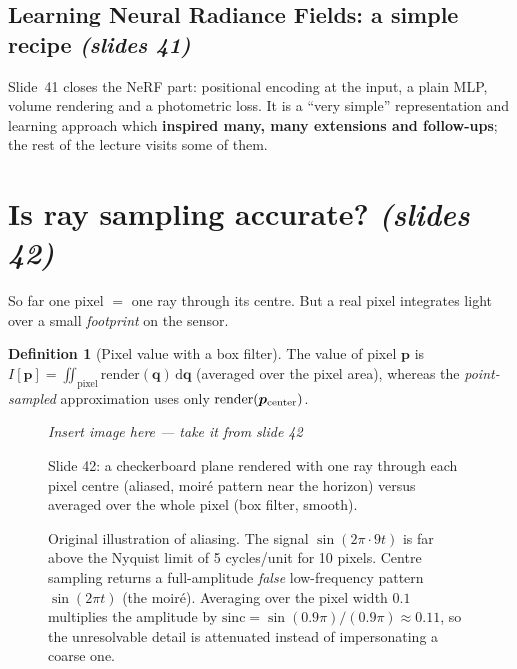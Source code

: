 \documentclass[11pt,a4paper]{article}
\newcommand{\dif}{\,\mathrm{d}}
\newcommand{\sref}[1]{\texorpdfstring{\emph{(slides #1)}}{(slides #1)}}
\theoremstyle{definition}
\newtheorem{definition}{Definition}[section]
\theoremstyle{plain}
\newcommand{\slideimg}[3]{%
\begin{figure}[H]
\centering
\begin{tcolorbox}[enhanced,colback=white,colframe=white,boxrule=0pt,sharp corners,overlay={\draw[dashed,gray,thick] (frame.south west) rectangle (frame.north east);},
  width=0.92\linewidth,height=#2,valign=center,halign=center]
{\color{gray}\itshape Insert image here --- take it from slide #1}
\end{tcolorbox}
\caption{#3}
\end{figure}}
\begin{document}
\subsection{Learning Neural Radiance Fields: a simple recipe \sref{41}}

Slide~41 closes the NeRF part: positional encoding at the input, a plain MLP, volume rendering and a photometric loss. It is a ``very simple'' representation and learning approach which \textbf{inspired many, many extensions and follow-ups}; the rest of the lecture visits some of them.

\section{Is ray sampling accurate? \sref{42}}

So far one pixel $=$ one ray through its centre. But a real pixel integrates light over a small \emph{footprint} on the sensor.

\begin{definition}[Pixel value with a box filter]
The value of pixel $\boldsymbol p$ is $I[\boldsymbol p]=\iint_{\text{pixel}}\mathrm{render}(\boldsymbol q)\dif\boldsymbol q$ (averaged over the pixel area), whereas the \emph{point-sampled} approximation uses only $\mathrm{render}(\boldsymbol p_{\rm center})$.
\end{definition}

\slideimg{42}{4.6cm}{Slide 42: a checkerboard plane rendered with one ray through each pixel centre (aliased, moir\'e pattern near the horizon) versus averaged over the whole pixel (box filter, smooth).}

\begin{figure}[H]
\centering
{}
\caption{Original illustration of aliasing. The signal $\sin(2\pi\cdot9t)$ is far above the Nyquist limit of 5 cycles/unit for 10 pixels. Centre sampling returns a full-amplitude \emph{false} low-frequency pattern $\sin(2\pi t)$ (the moir\'e). Averaging over the pixel width $0.1$ multiplies the amplitude by $\mathrm{sinc}=\sin(0.9\pi)/(0.9\pi)\approx0.11$, so the unresolvable detail is attenuated instead of impersonating a coarse one.}
\end{figure}
\end{document}
